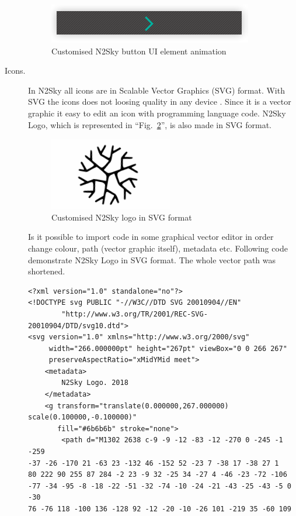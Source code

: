 \begin{description}
\begin{figure}[htbp]
\begin{center}
  \includegraphics[scale=0.55]{components/3/components/button_active.png}
  \caption{Customised N2Sky button UI element animation}
  \label{fig:button_active}
\end{center}
\end{figure}

\item[Icons.] In N2Sky all icons are in Scalable Vector Graphics (SVG) format. With SVG the icons does not loosing quality in any device \cite{Cagle2005}. Since it is a vector graphic it easy to edit an icon with programming language code. N2Sky Logo, which is represented in ``Fig.~\ref{fig:logo}'',  is also made in SVG format. 

\begin{figure}[htbp]
\begin{center}
  \includegraphics[scale=0.55]{components/3/components/logo.png}
  \caption{Customised N2Sky logo in SVG format}
  \label{fig:logo}
\end{center}
\end{figure}

Is it possible to import code in some graphical vector editor in order change colour, path (vector graphic itself), metadata etc. Following code demonstrate N2Sky Logo in SVG format. The whole vector path was shortened.

\begin{lstlisting}
<?xml version="1.0" standalone="no"?>
<!DOCTYPE svg PUBLIC "-//W3C//DTD SVG 20010904//EN"
        "http://www.w3.org/TR/2001/REC-SVG-20010904/DTD/svg10.dtd">
<svg version="1.0" xmlns="http://www.w3.org/2000/svg"
     width="266.000000pt" height="267pt" viewBox="0 0 266 267"
     preserveAspectRatio="xMidYMid meet">
    <metadata>
        N2Sky Logo. 2018
    </metadata>
    <g transform="translate(0.000000,267.000000) scale(0.100000,-0.100000)"
       fill="#6b6b6b" stroke="none">
        <path d="M1302 2638 c-9 -9 -12 -83 -12 -270 0 -245 -1 -259
-37 -26 -170 21 -63 23 -132 46 -152 52 -23 7 -38 17 -38 27 1
80 222 90 255 87 284 -2 23 -9 32 -25 34 -27 4 -46 -23 -72 -106 
-77 -34 -95 -8 -18 -22 -51 -32 -74 -10 -24 -21 -43 -25 -43 -5 0 -30 
76 -76 118 -100 136 -128 92 -12 -20 -10 -26 101 -219 35 -60 109 


\end{lstlisting}
\end{description}
